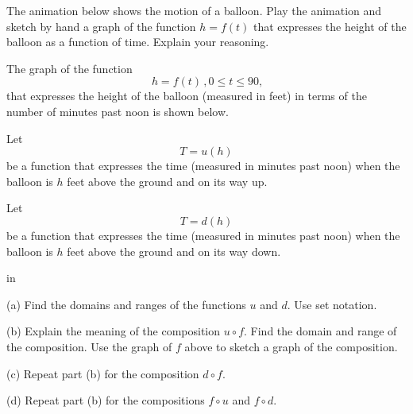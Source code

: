 \documentclass{ximera}
\newcommand{\pskip}{\vskip 0.1 in}
\begin{document}
\begin{exploration} \label{E2:Quadratics}
The animation below shows the motion of a balloon. Play the animation and sketch by hand a graph of the function $h=f(t)$ that expresses the height of the balloon as a function of time. Explain your reasoning.


 
\begin{onlineOnly}
    \begin{center}
\end{center}
\end{onlineOnly}
\end{exploration}



\begin{exploration} \label{E4:Quadratics}
The graph of the function 
\[
\   h=f(t) \, , 0\leq t \leq 90, 
\]
that expresses the height of the balloon (measured in feet) in terms of the number of minutes past noon is shown below. 

 
\begin{onlineOnly}
    \begin{center}
\end{center}
\end{onlineOnly}


Let 
\[
    T = u(h)
\]
be a function that expresses the time (measured in minutes past noon) when the balloon is $h$ feet above the ground and on its way up.

Let 
\[
    T = d(h)
\]
be a function that expresses the time (measured in minutes past noon) when the balloon is $h$ feet above the ground and on its way down.

\pskip

(a) Find the domains and ranges of the functions $u$ and $d$. Use set notation.

(b) Explain the meaning of the composition $u\circ f$. Find the domain and range of the composition. Use the graph of $f$ above to sketch a graph of the composition.

(c) Repeat part (b) for the composition $d\circ f$.

(d) Repeat part (b) for the compositions $f\circ u$ and $f\circ d$.

\end{exploration}
\end{document}
